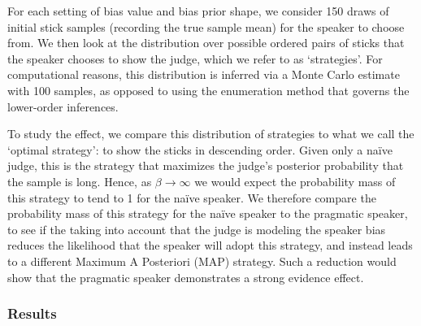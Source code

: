 \documentclass[10pt,letterpaper]{article}
\begin{document}
For each setting of bias value and bias prior shape, we consider 150 draws of initial stick samples (recording the true sample mean)
for the speaker to choose from.
We then look at the distribution over possible ordered pairs of sticks that the speaker chooses to show the judge, 
which we refer to as `strategies'. For computational reasons, this distribution is inferred via a Monte Carlo estimate with 100 samples,
as opposed to using the enumeration method that governs the lower-order inferences.

To study the effect, we compare this distribution of strategies to what we call the `optimal strategy': to show the sticks in descending order.
Given only a na\"ive judge, this is the strategy that maximizes the judge's posterior probability that the sample is long. Hence, as 
$\beta\to\infty$ we would expect the probability mass of this strategy to tend to 1 for the na\"ive speaker. We therefore compare the probability mass of this 
strategy for the na\"ive speaker to the pragmatic speaker, to see if the taking into account that the judge is modeling the speaker bias reduces the 
likelihood that the speaker will adopt this strategy, and instead leads to a different Maximum A Posteriori (MAP) strategy. Such
a reduction would show that the pragmatic speaker demonstrates a strong evidence effect.

\subsubsection{Results}
\begin{table}[H]
\begin{center} 
\caption{Percentage of trials for which the MAP strategy is the optimal strategy, given for both speakers $S_1$ and $S_2$.} 
\label{seeSpeakerTable} 
\vskip 0.12in
\end{center} 
\end{table}
\end{document}
